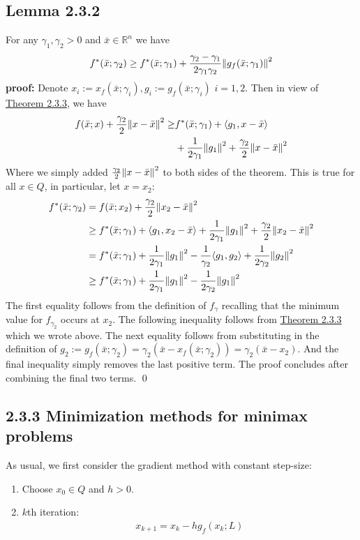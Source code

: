\documentclass[12pt,a4paper]{article}
\begin{document}
	 \subsection*{Lemma 2.3.2}\label{lem232}
	 For any $\gamma_1 , \gamma_2 >0$ and $\bar{x} \in \mathbb{R}^n$ we have
	 \begin{align*}
	 	f^*(\bar{x};\gamma_2) \geq f^*(\bar{x};\gamma_1) + \frac{\gamma_2 - \gamma_1}{2\gamma_1\gamma_2}\norm{g_f(\bar{x};\gamma_1)}^2
	 \end{align*}
	 \textbf{proof:} Denote $x_i := x_f(\bar{x};\gamma_i), g_i := g_f(\bar{x};\gamma_i)$ $i=1,2$. Then in view of \hyperref[thm233]{Theorem 2.3.3}, 
	 we have
	 \begin{align*}
	 	f(\bar{x};x) + \frac{\gamma_2}{2}\norm{x - \bar{x}}^2 \geq &f^*(\bar{x};\gamma_1) + \langle g_1, x - \bar{x} \rangle \\
	 	&+ \frac{1}{2\gamma_1}\norm{g_1}^2 + \frac{\gamma_2}{2}\norm{x - \bar{x}}^2
	 \end{align*}
	 Where we simply added $ \frac{\gamma_2}{2}\norm{x - \bar{x}}^2$ to both sides of the theorem. This is true for all $x \in Q$, in particular, let $x = x_2$:
	 \begin{align*}
	 	f^*(\bar{x};\gamma_2) &= f(\bar{x};x_2) + \frac{\gamma_2}{2}\norm{x_2 - \bar{x}}^2 \\
	 	&\geq f^*(\bar{x};\gamma_1) + \langle g_1, x_2 - \bar{x} \rangle + \frac{1}{2\gamma_1}\norm{g_1}^2 + \frac{\gamma_2}{2}\norm{x_2 - \bar{x}}^2 \\
	 	&= f^*(\bar{x};\gamma_1) + \frac{1}{2\gamma_1}\norm{g_1}^2 - \frac{1}{\gamma_2}\langle g_1, g_2 \rangle + \frac{1}{2\gamma_2}\norm{g_2}^2 \\
	 	&\geq f^*(\bar{x};\gamma_1) + \frac{1}{2\gamma_1}\norm{g_1}^2 - \frac{1}{2\gamma_2}\norm{g_1}^2
	 \end{align*} 
	 The first equality follows from the definition of $f_{\gamma}$ recalling that the minimum value for $f_{\gamma_2}$ occurs at $x_2$. The following inequality follows from \hyperref[thm233]{Theorem 2.3.3} which we wrote above. The next equality follows from substituting in the definition of $g_2 := g_f(\bar{x};\gamma_2) = \gamma_2(\bar{x} - x_f(\bar{x};\gamma_2)) = \gamma_2(\bar{x} - x_2)$. And the final inequality simply removes the last positive term. The proof concludes after combining the final two terms. \qed 
	 \subsection*{2.3.3 Minimization methods for minimax problems}\label{sec233}
	 As usual, we first consider the gradient method with constant step-size:
	 \begin{enumerate}\label{gradoptminimax}
	 	\setcounter{enumi}{-1}
	 	\item Choose $x_0 \in Q$ and $h > 0$. 
	 	\item $k$th iteration: 
	 	\begin{align*}
	 		x_{k+1} = x_k - hg_f(x_k;L)
	 	\end{align*}
	 \end{enumerate}
\end{document}
